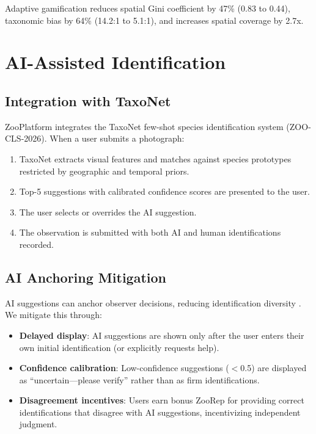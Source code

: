 \documentclass[11pt,a4paper]{article}
\begin{document}
Adaptive gamification reduces spatial Gini coefficient by 47\% (0.83 to
0.44), taxonomic bias by 64\% (14.2:1 to 5.1:1), and increases spatial
coverage by 2.7x.


\section{AI-Assisted Identification}
\label{sec:ai}

\subsection{Integration with TaxoNet}

ZooPlatform integrates the TaxoNet few-shot species identification
system (ZOO-CLS-2026). When a user submits a photograph:

\begin{enumerate}
  \item TaxoNet extracts visual features and matches against species
    prototypes restricted by geographic and temporal priors.
  \item Top-5 suggestions with calibrated confidence scores are
    presented to the user.
  \item The user selects or overrides the AI suggestion.
  \item The observation is submitted with both AI and human
    identifications recorded.
\end{enumerate}

\subsection{AI Anchoring Mitigation}

AI suggestions can anchor observer decisions, reducing identification
diversity \citep{terry2020think}. We mitigate this through:

\begin{itemize}
  \item \textbf{Delayed display}: AI suggestions are shown only after
    the user enters their own initial identification (or explicitly
    requests help).
  \item \textbf{Confidence calibration}: Low-confidence suggestions
    ($<$0.5) are displayed as ``uncertain---please verify'' rather than
    as firm identifications.
  \item \textbf{Disagreement incentives}: Users earn bonus ZooRep for
    providing correct identifications that disagree with AI suggestions,
    incentivizing independent judgment.
\end{itemize}
\end{document}
